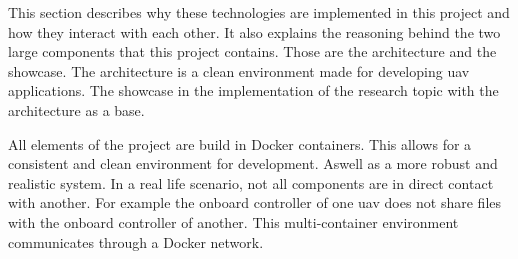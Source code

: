 This section describes why these technologies are implemented in this project and how they interact with each other. It also explains the reasoning behind the two large components that this project contains. Those are the architecture and the showcase. The architecture is a clean environment made for developing \acs{uav} applications. The showcase in the implementation of the research topic with the architecture as a base.

All elements of the project are build in Docker containers. This allows for a consistent and clean environment for development. Aswell as a more robust and realistic system. In a real life scenario, not all components are in direct contact with another. For example the onboard controller of one \acs{uav} does not share files with the onboard controller of another. This multi\hyp{}container environment communicates through a Docker network.